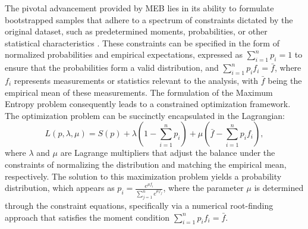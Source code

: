 \documentclass[ijoc,sglanonrev]{informs4}
\begin{document}
The pivotal advancement provided by MEB lies in its ability to formulate bootstrapped samples that adhere to a spectrum of constraints dictated by the original dataset, such as predetermined moments, probabilities, or other statistical characteristics \citep{berger1985statistical}. These constraints can be specified in the form of normalized probabilities and empirical expectations, expressed as $\sum_{i=1}^{n} p_i = 1$ to ensure that the probabilities form a valid distribution, and $\sum_{i=1}^{n} p_i f_i = \bar{f}$, where $f_i$ represents measurements or statistics relevant to the analysis, with $\bar{f}$ being the empirical mean of these measurements. The formulation of the Maximum Entropy problem consequently leads to a constrained optimization framework. The optimization problem can be succinctly encapsulated in the Lagrangian:
\begin{equation}
	L(p, \lambda, \mu) = S(p) + \lambda \left(1 - \sum_{i=1}^{n} p_i\right) + \mu \left(\bar{f} - \sum_{i=1}^{n} p_i f_i\right),
\end{equation}
where $\lambda$ and $\mu$ are Lagrange multipliers that adjust the balance under the constraints of normalizing the distribution and matching the empirical mean, respectively. The solution to this maximization problem yields a probability distribution, which appears as
$p_i = \frac{e^{\mu f_i}}{\sum_{j=1}^{n} e^{\mu f_j}}$,  where the parameter $\mu$ is determined through the constraint equations, specifically via a numerical root-finding approach that satisfies the moment condition $\sum_{i=1}^{n} p_i f_i = \bar{f}$.
\end{document}
